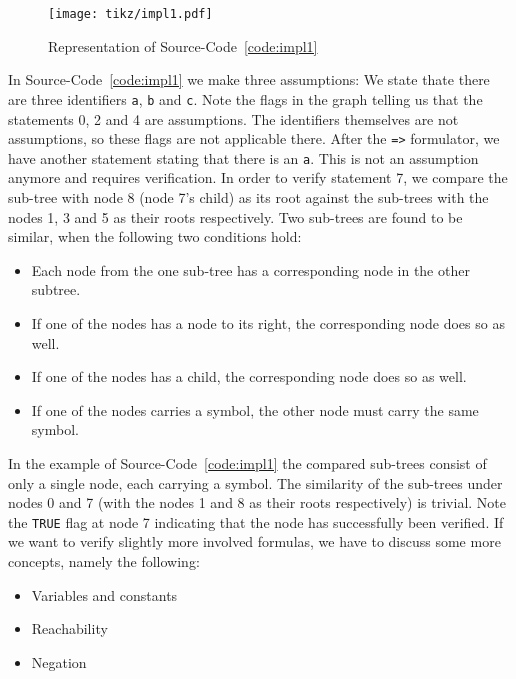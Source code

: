 \documentclass[british]{article}
\newcommand\prv{bc}
\newcommand\m[1]{\texttt{#1}}
\newenvironment{code}{\captionsetup{type=listing}}{}
\newcommand\scref[1]{Source-Code~\ref{code:#1}}
\begin{document}
\begin{code}
\label{code:impl1}
\inputminted[linenos]{\prv}{examples/impl1.prove}
\end{code}

\begin{figure}[!h]
\caption{Representation of \scref{impl1}}\label{fig:impl1}
\centering
\texttt{[image: tikz/impl1.pdf]}
\end{figure}

In \scref{impl1} we make three assumptions: We state thate there are three identifiers \m{a}, \m{b} and \m{c}. Note the flags in the graph telling us that the statements 0, 2 and 4 are assumptions. The identifiers themselves are not assumptions, so these flags are not applicable there. After the \m{=>} formulator, we have another statement stating that there is an \m{a}. This is not an assumption anymore and requires verification. In order to verify statement 7, we compare the sub-tree with node 8 (node 7's child) as its root against the sub-trees with the nodes 1, 3 and 5 as their roots respectively. Two sub-trees are found to be similar, when the following two conditions hold:

\begin{itemize}
	\item 
		Each node from the one sub-tree has a corresponding node in the other subtree.
	\item
		If one of the nodes has a node to its right, the corresponding node does so as well.
	\item
		If one of the nodes has a child, the corresponding node does so as well.
	\item
		If one of the nodes carries a symbol, the other node must carry the same symbol.
\end{itemize}

In the example of \scref{impl1} the compared sub-trees consist of only a single node, each carrying a symbol. The similarity of the sub-trees under nodes 0 and 7 (with the nodes 1 and 8 as their roots respectively) is trivial. Note the \texttt{TRUE} flag at node 7 indicating that the node has successfully been verified. If we want to verify slightly more involved formulas, we have to discuss some more concepts, namely the following:

\begin{itemize}
	\item 
		Variables and constants
	\item 
		Reachability
	\item 
		Negation
\end{itemize}
\end{document}
